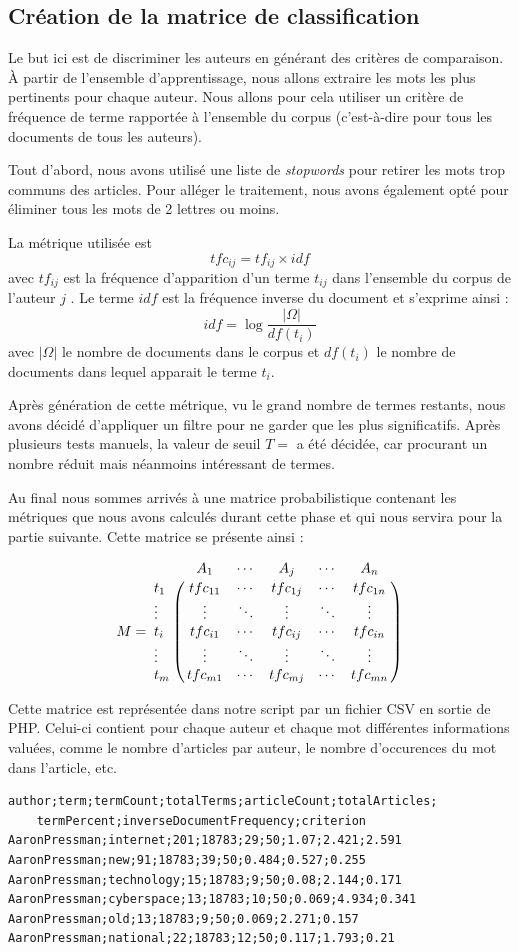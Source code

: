 \documentclass[a4paper]{article}
\begin{document}
\subsection{Création de la matrice de classification}
Le but ici est de discriminer les auteurs en générant des critères de comparaison. À partir de l'ensemble d'apprentissage, nous allons extraire les mots les plus pertinents pour chaque auteur. Nous allons pour cela utiliser un critère de fréquence de terme rapportée à l'ensemble du corpus (c'est-à-dire pour tous les documents de tous les auteurs).

Tout d'abord, nous avons utilisé une liste de \textit{stopwords} pour retirer les mots trop communs des articles. Pour alléger le traitement, nous avons également opté pour éliminer tous les mots de 2 lettres ou moins. 

La métrique utilisée est \[ tfc_{ij} = tf_{ij} \times idf\] avec $tf_{ij}$ est la fréquence d'apparition d'un terme $t_{ij}$ dans l'ensemble du corpus de l'auteur $j$ . Le terme $idf$ est la fréquence inverse du document et s'exprime ainsi : \[idf = \log \frac{|\Omega|}{df(t_{i})} \] avec $|\Omega|$ le nombre de documents dans le corpus et $df(t_{i})$ le nombre de documents dans lequel apparait le terme $t_{i}$.

Après génération de cette métrique, vu le grand nombre de termes restants, nous avons décidé d'appliquer un filtre pour ne garder que les plus significatifs. Après plusieurs tests manuels, la valeur de seuil $T = $  a été décidée, car procurant un nombre réduit mais néanmoins intéressant de termes.

Au final nous sommes arrivés à une matrice probabilistique contenant les métriques que nous avons calculés durant cette phase et qui nous servira pour la partie suivante. Cette matrice se présente ainsi :

\[M=\bordermatrix{
&A_{1}&\cdots&A_{j}&\cdots&A_{n}\cr
t_{1}& tfc_{11} & \cdots & tfc_{1j} & \cdots & tfc_{1n} \cr
\vdots&\vdots&\ddots&\vdots&\ddots&\vdots\cr
t_{i}& tfc_{i1} & \cdots & tfc_{ij} & \cdots & tfc_{in} \cr
\vdots&\vdots&\ddots&\vdots&\ddots&\vdots\cr
t_{m}& tfc_{m1} & \cdots & tfc_{mj} & \cdots & tfc_{mn} \cr
}\]

Cette matrice est représentée dans notre script par un fichier CSV en sortie de PHP. Celui-ci contient pour chaque auteur et chaque mot différentes informations valuées, comme le nombre d'articles par auteur, le nombre d'occurences du mot dans l'article, etc.
\begin{Verbatim}[frame=lines,labelposition=topline]
author;term;termCount;totalTerms;articleCount;totalArticles;
	termPercent;inverseDocumentFrequency;criterion
AaronPressman;internet;201;18783;29;50;1.07;2.421;2.591
AaronPressman;new;91;18783;39;50;0.484;0.527;0.255
AaronPressman;technology;15;18783;9;50;0.08;2.144;0.171
AaronPressman;cyberspace;13;18783;10;50;0.069;4.934;0.341
AaronPressman;old;13;18783;9;50;0.069;2.271;0.157
AaronPressman;national;22;18783;12;50;0.117;1.793;0.21
\end{Verbatim}
\end{document}
